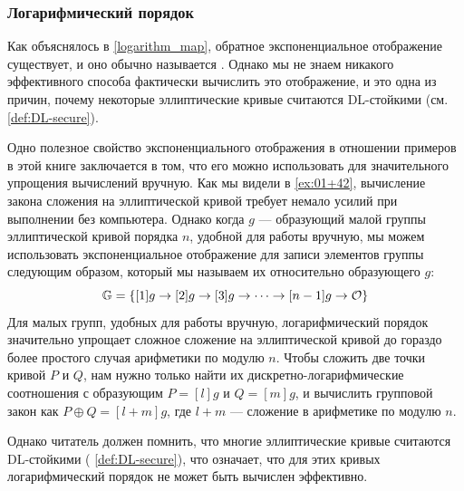 \subsubsection{Логарифмический порядок}
\label{def:logarithmic_ordering}
Как объяснялось в \eqref{logarithm_map}, обратное экспоненциальное отображение существует, и оно обычно называется . Однако мы не знаем никакого эффективного способа фактически вычислить это отображение, и это одна из причин, почему некоторые эллиптические кривые считаются DL-стойкими (см.  \ref{def:DL-secure}).

Одно полезное свойство экспоненциального отображения в отношении примеров в этой книге заключается в том, что его можно использовать для значительного упрощения вычислений вручную. Как мы видели в \examplename{} \ref{ex:01+42}, вычисление закона сложения на эллиптической кривой требует немало усилий при выполнении без компьютера. Однако когда $g$ — образующий малой группы эллиптической кривой порядка $n$, удобной для работы вручную, мы можем использовать экспоненциальное отображение для записи элементов группы следующим образом, который мы называем их  относительно образующего $g$:
\begin{equation}\label{def:logarithmic_order}
\mathbb{G} = \{[1]g\to [2]g \to [3]g\to\cdots\to [n-1]g\to \mathcal{O}\}
\end{equation} 
Для малых групп, удобных для работы вручную, логарифмический порядок значительно упрощает сложное сложение на эллиптической кривой до гораздо более простого случая арифметики по модулю $n$. Чтобы сложить две точки кривой $P$ и $Q$, нам нужно только найти их дискретно-логарифмические соотношения с образующим $P=[l]g$ и $Q=[m]g$, и вычислить групповой закон как $P\oplus Q = [l+m]g$, где $l+m$ — сложение в арифметике по модулю $n$. 

Однако читатель должен помнить, что многие эллиптические кривые считаются DL-стойкими ( \ref{def:DL-secure}), что означает, что для этих кривых логарифмический порядок не может быть вычислен эффективно.  


